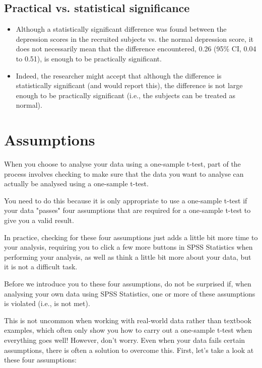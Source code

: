 \documentclass[]{article}
\begin{document}
\subsection{Practical vs. statistical significance}
\begin{itemize}
	\item Although a statistically significant difference was found between the depression scores in the recruited subjects vs. the normal depression score, it does not necessarily mean that the difference encountered, 0.26 (95\% CI, 0.04 to 0.51), is enough to be practically significant. 
	\item Indeed, the researcher might accept that although the difference is statistically significant (and would report this), the difference is not large enough to be practically significant (i.e., the subjects can be treated as normal).
	
\end{itemize}

\newpage
\section{Assumptions}
When you choose to analyse your data using a one-sample t-test, part of the process involves checking to make sure that the data you want to analyse can actually be analysed using a one-sample t-test. 


You need to do this because it is only appropriate to use a one-sample t-test if your data "passes" four assumptions that are required for a one-sample t-test to give you a valid result. 

In practice, checking for these four assumptions just adds a little bit more time to your analysis, requiring you to click a few more buttons in SPSS Statistics when performing your analysis, as well as think a little bit more about your data, but it is not a difficult task.

Before we introduce you to these four assumptions, do not be surprised if, when analysing your own data using SPSS Statistics, one or more of these assumptions is violated (i.e., is not met). 

This is not uncommon when working with real-world data rather than textbook examples, which often only show you how to carry out a one-sample t-test when everything goes well! However, don’t worry. Even when your data fails certain assumptions, there is often a solution to overcome this. First, let’s take a look at these four assumptions:
\end{document}
